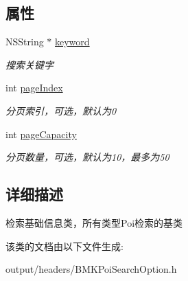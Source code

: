 \subsection*{属性}
\begin{DoxyCompactItemize}
\item 
\hypertarget{interface_b_m_k_base_poi_search_option_af74b52da74e6d70c2904774938d4358a}{}N\+S\+String $\ast$ \hyperlink{interface_b_m_k_base_poi_search_option_af74b52da74e6d70c2904774938d4358a}{keyword}\label{interface_b_m_k_base_poi_search_option_af74b52da74e6d70c2904774938d4358a}

\begin{DoxyCompactList}\small\item\em 搜索关键字 \end{DoxyCompactList}\item 
\hypertarget{interface_b_m_k_base_poi_search_option_a23b7f5ccb9cdb0c77dc80e57039be011}{}int \hyperlink{interface_b_m_k_base_poi_search_option_a23b7f5ccb9cdb0c77dc80e57039be011}{page\+Index}\label{interface_b_m_k_base_poi_search_option_a23b7f5ccb9cdb0c77dc80e57039be011}

\begin{DoxyCompactList}\small\item\em 分页索引，可选，默认为0 \end{DoxyCompactList}\item 
\hypertarget{interface_b_m_k_base_poi_search_option_a6c4467b4e1f98bebf75d59f95b6fc85d}{}int \hyperlink{interface_b_m_k_base_poi_search_option_a6c4467b4e1f98bebf75d59f95b6fc85d}{page\+Capacity}\label{interface_b_m_k_base_poi_search_option_a6c4467b4e1f98bebf75d59f95b6fc85d}

\begin{DoxyCompactList}\small\item\em 分页数量，可选，默认为10，最多为50 \end{DoxyCompactList}\end{DoxyCompactItemize}


\subsection{详细描述}
检索基础信息类，所有类型\+Poi检索的基类 

该类的文档由以下文件生成\+:\begin{DoxyCompactItemize}
\item 
output/headers/B\+M\+K\+Poi\+Search\+Option.\+h\end{DoxyCompactItemize}
